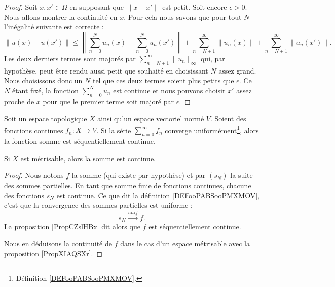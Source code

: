 \begin{proof}
    Soit \( x,x'\in \Omega\) en supposant que \( \| x-x' \|\) est petit. Soit encore \( \epsilon>0\). Nous allons montrer la continuité en \( x\). Pour cela nous savons que pour tout \( N\) l'inégalité suivante est correcte :
    \begin{equation}
        \| u(x)-u(x') \|\leq \left\|  \sum_{n=0}^Nu_n(x)-\sum_{n=0}^{N}u_n(x') \right\|+\sum_{n=N+1}^{\infty}\| u_n(x) \|+\sum_{n=N+1}^{\infty}\| u_n(x') \|.
    \end{equation}
    Les deux derniers termes sont majorés par \( \sum_{n=N+1}^{\infty}\| u_n \|_{\infty}\) qui, par hypothèse, peut être rendu aussi petit que souhaité en choisissant \( N\) assez grand. Nous choisissons donc un \( N\) tel que ces deux termes soient plus petits que \( \epsilon\). Ce \( N\) étant fixé, la fonction \( \sum_{n=0}^{N}u_n\) est continue et nous pouvons choisir \( x'\) assez proche de \( x\) pour que le premier terme soit majoré par \( \epsilon\).
\end{proof}

\begin{theorem}			\label{ThoSerUnifCont}
    Soit un espace topologique \( X\) ainsi qu'un espace vectoriel normé \( V\). Soient des fonctions continues \( f_n\colon X\to V\). Si la série \( \sum_{n=0}^{\infty}f_n\) converge uniformément\footnote{Définition \ref{DEFooPABSooPMXMOV}.}, alors la fonction somme est séquentiellement continue.

    Si \( X\) est métrisable, alors la somme est continue.
\end{theorem}

\begin{proof}
    Nous notons \( f\) la somme (qui existe par hypothèse) et par \( (s_N)\) la suite des sommes partielles. En tant que somme finie de fonctions continues, chacune des fonctions \( s_N\) est continue. Ce que dit la définition \ref{DEFooPABSooPMXMOV}, c'est que la convergence des sommes partielles est uniforme :
    \begin{equation}
        s_N\stackrel{unif}{\longrightarrow}f.
    \end{equation}
    La proposition \ref{PropCZslHBx} dit alors que \( f\) est séquentiellement continue.

    Nous en déduisons la continuité de \( f\) dans le cas d'un espace métrisable avec la proposition \ref{PropXIAQSXr}.
\end{proof}

